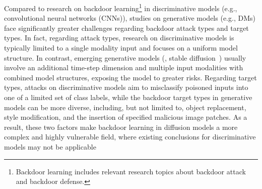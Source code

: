 Compared to research on backdoor learning\footnote{Backdoor learning includes relevant research topics about backdoor attack and backdoor defense.} in discriminative models (e.g., convolutional neural networks (CNNs)), studies on generative models (e.g., DMs) face significantly greater challenges regarding backdoor attack types and target types.
In fact, regarding attack types, research on discriminative models is typically limited to a single modality input and focuses on a uniform model structure.
In contrast, emerging generative models (\eg, stable diffusion~\cite{rombach2022high}) usually involve an additional time-step dimension and multiple input modalities with combined model structures, exposing the model to greater risks. 
Regarding target types, attacks on discriminative models aim to misclassify poisoned inputs into one of a limited set of class labels, while the backdoor target types in generative models can be more diverse, including, but not limited to, object replacement, style modification, and the insertion of specified malicious image patches.
As a result, these two factors make backdoor learning in diffusion models a more complex and highly vulnerable field, where existing conclusions for discriminative models may not be applicable


